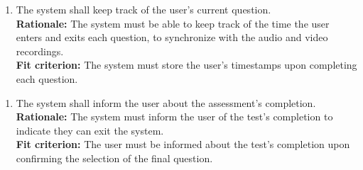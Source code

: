 \documentclass[12pt]{article}
\begin{document}
\begin{enumerate}[{FR-AI}6. ]
  \item The system shall keep track of the user's current question.\\
  \textbf{Rationale: }The system must be able to keep track of the time the user enters and exits each question, to synchronize with the audio and video recordings.\\
  \textbf{Fit criterion: }The system must store the user's timestamps upon completing each question.
\end{enumerate}
\begin{enumerate}[{FR-AI}7. ]
  \item The system shall inform the user about the assessment's completion.\\
  \textbf{Rationale: }The system must inform the user of the test's completion to indicate they can exit the system.\\
  \textbf{Fit criterion: }The user must be informed about the test's completion upon confirming the selection of the final question.
\end{enumerate}
\end{document}
